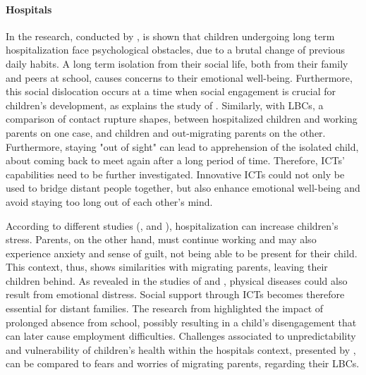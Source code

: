 
\paragraph{Hospitals}
In the research, conducted by \textcite{wadley2014exploring}, is shown that children undergoing long term hospitalization face psychological obstacles, due to a brutal change of previous daily habits. A long term isolation from their social life, both from their family and peers at school, causes concerns to their emotional well-being. Furthermore, this social dislocation occurs at a time when social engagement is crucial for children’s development, as explains the study of \textcite{hopkins2014embedding}. Similarly, with LBCs, a comparison of contact rupture shapes, between hospitalized children and working parents on one case, and children and out-migrating parents on the other. Furthermore, staying "out of sight" can lead to apprehension of the isolated child, about coming back to meet again after a long period of time. Therefore, ICTs' capabilities need to be further investigated. Innovative ICTs could not only be used to bridge distant people together, but also enhance emotional well-being and avoid staying too long out of each other's mind. 

According to different studies (\cite{vernon1971psychological}, \cite{bossert1994stress} and \cite{thomson2012body}), hospitalization can increase children's stress. Parents, on the other hand, must continue working and may also experience anxiety and sense of guilt, not being able to be present for their child. This context, thus, shows similarities with migrating parents, leaving their children behind. As revealed in the studies of \textcite{stewart1998emotional} and \textcite{ryan2001happiness}, physical diseases could also result from emotional distress. Social support through ICTs becomes therefore essential for distant families. The research from \textcite{hopkins2013hospitalised} highlighted the impact of prolonged absence from school, possibly resulting in a child’s disengagement that can later cause employment difficulties. Challenges associated to unpredictability and vulnerability of children’s health within the hospitals context, presented by \textcite{yates2010keeping} , can be compared to fears and worries of migrating parents, regarding their LBCs. 

